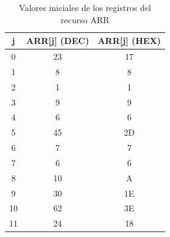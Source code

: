 \documentclass[12pt,a4paper,oneside]{article}
\begin{document}
\begin{table}[] \centering
    \begin{tabular}{|c|c|c|}
    \hline
    j  & ARR{[}j{]} (DEC) & ARR{[}j{]} (HEX) \\ \hline
    0  & 23               & 17               \\ \hline
    1  & 8                & 8                \\ \hline
    2  & 1                & 1                \\ \hline
    3  & 9                & 9                \\ \hline
    4  & 6                & 6                \\ \hline
    5  & 45               & 2D               \\ \hline
    6  & 7                & 7                \\ \hline
    7  & 6                & 6                \\ \hline
    8  & 10               & A                \\ \hline
    9  & 30               & 1E               \\ \hline
    10 & 62               & 3E               \\ \hline
    11 & 24               & 18               \\ \hline
    \end{tabular}
    \caption{Valores iniciales de los registros del recurso ARR} \label{val_inic}
\end{table}
\end{document}
